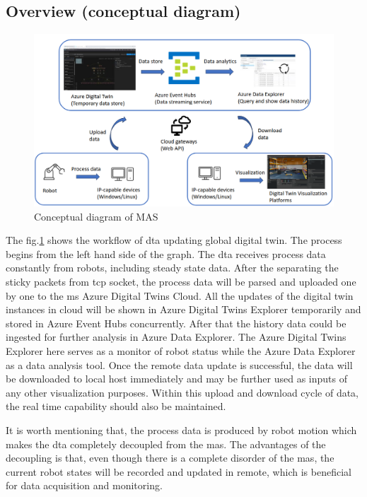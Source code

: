 \subsection{Overview (conceptual diagram)}\label{chap: Overview-External}

\begin{figure}[htb]
\includegraphics[width=\textwidth]{figures/DT_Conceptual_Diagram.png}

\centering
\caption{Conceptual diagram of MAS\label{fig: DTConceptual}}
\end{figure}

The fig.\ref{fig: DTConceptual} shows the workflow of \gls{dta} updating global digital twin.
The process begins from the left hand side of the graph. The \gls{dta} receives process data constantly from robots, including steady state data. 
After the separating the sticky packets from \gls{tcp} socket, the process data will be parsed and uploaded one by one to the \gls{ms} Azure Digital Twins Cloud. 
All the updates of the digital twin instances in cloud will be shown in Azure Digital Twins Explorer temporarily and stored in Azure Event Hubs concurrently. 
After that the history data could be ingested for further analysis in Azure Data Explorer. 
The Azure Digital Twins Explorer here serves as a monitor of robot status while the Azure Data Explorer as a data analysis tool. 
Once the remote data update is successful, the data will be downloaded to local host immediately and may be further used as inputs of any other visualization purposes. 
Within this upload and download cycle of data, the real time capability should also be maintained.  


It is worth mentioning that, the process data is produced by robot motion which makes the \gls{dta} completely decoupled from the \gls{mas}. 
The advantages of the decoupling is that, even though there is a complete disorder of the \gls{mas}, the current robot states will be recorded and updated in remote, 
which is beneficial for data acquisition and monitoring. 



